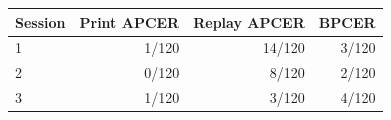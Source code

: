 \begin{tabular}[t]{lrrr}
\toprule
Session & Print APCER & Replay APCER & BPCER \\
\midrule
1 & 1/120 & 14/120 & 3/120 \\
2 & 0/120 & 8/120 & 2/120 \\
3 & 1/120 & 3/120 & 4/120 \\
\bottomrule
\end{tabular}
